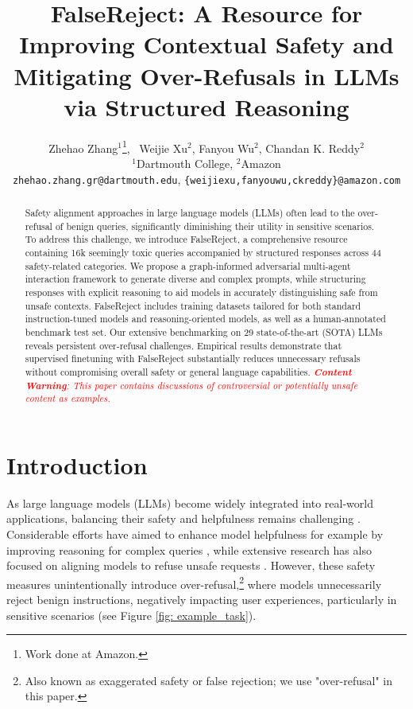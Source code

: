 \documentclass{article} %
\title{FalseReject: A Resource for Improving Contextual Safety and Mitigating Over-Refusals in LLMs via Structured Reasoning}
\author{
  Zhehao Zhang$^{1}$\thanks{Work done at Amazon.},  ~Weijie Xu$^{2}$, Fanyou Wu$^{2}$, Chandan K. Reddy$^{2}$ \\
  $^1$Dartmouth College, $^2$Amazon
  \\
    \texttt{zhehao.zhang.gr@dartmouth.edu}, \texttt{\{weijiexu,fanyouwu,ckreddy\}@amazon.com}
}
\begin{document}
\ifcolmsubmission
\linenumbers
\fi

\maketitle

\begin{abstract}
Safety alignment approaches in large language models (LLMs) often lead to the over-refusal of benign queries, significantly diminishing their utility in sensitive scenarios. To address this challenge, we introduce FalseReject, a comprehensive resource containing 16k seemingly toxic queries accompanied by structured responses across 44 safety-related categories. We propose a graph-informed adversarial multi-agent interaction framework to generate diverse and complex prompts, while structuring responses with explicit reasoning to aid models in accurately distinguishing safe from unsafe contexts. FalseReject includes training datasets tailored for both standard instruction-tuned models and reasoning-oriented models, as well as a human-annotated benchmark test set. Our extensive benchmarking on 29 state-of-the-art (SOTA) LLMs reveals persistent over-refusal challenges. Empirical results demonstrate that supervised finetuning with FalseReject substantially reduces unnecessary refusals without compromising overall safety or general language capabilities. \textcolor{red}{\textit{\textbf{Content Warning}: This paper contains discussions of controversial or potentially unsafe content as examples.}}\end{abstract}
 
\section{Introduction}

As large language models (LLMs) become widely integrated into real-world applications, balancing their safety and helpfulness remains challenging \citep{askell2021general}. Considerable efforts have aimed to enhance model helpfulness for example by improving reasoning for complex queries \citep{wei2022chain}, while extensive research has also focused on aligning models to refuse unsafe requests \citep{bai2022training}. However, these safety measures unintentionally introduce over-refusal,\footnote{Also known as exaggerated safety or false rejection; we use "over-refusal" in this paper.} where models unnecessarily reject benign instructions, negatively impacting user experiences, particularly in sensitive scenarios (see Figure \ref{fig: example_task}).
\end{document}
